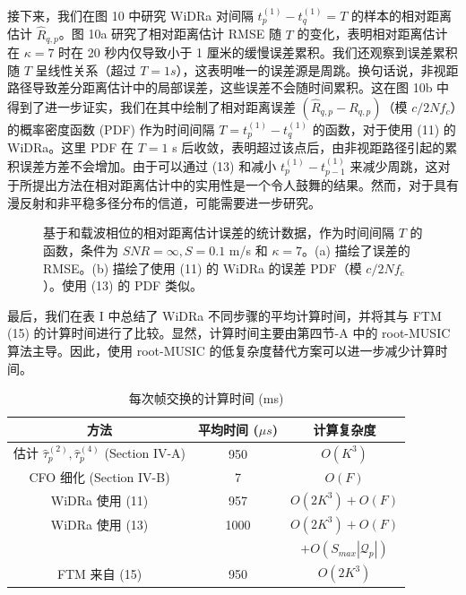 \documentclass[journal]{IEEEtran}
\begin{document}
接下来，我们在图 10 中研究 WiDRa 对间隔 $t_p^{(1)} - t_q^{(1)} = T$ 的样本的相对距离估计 $\hat{R}_{q,p}$。图 10a 研究了相对距离估计 RMSE 随 $T$ 的变化，表明相对距离估计在 $\kappa=7$ 时在 20 秒内仅导致小于 1 厘米的缓慢误差累积。我们还观察到误差累积随 $T$ 呈线性关系（超过 $T=1s$），这表明唯一的误差源是周跳。换句话说，非视距路径导致差分距离估计中的局部误差，这些误差不会随时间累积。这在图 10b 中得到了进一步证实，我们在其中绘制了相对距离误差 $(\hat{R}_{q,p} - R_{q,p})$（模 $c/2Nf_c$）的概率密度函数 (PDF) 作为时间间隔 $T = t_p^{(1)} - t_q^{(1)}$ 的函数，对于使用 (11) 的 WiDRa。这里 PDF 在 $T=1$ s 后收敛，表明超过该点后，由非视距路径引起的累积误差方差不会增加。由于可以通过 (13) 和减小 $t_p^{(1)} - t_{p-1}^{(1)}$ 来减少周跳，这对于所提出方法在相对距离估计中的实用性是一个令人鼓舞的结果。然而，对于具有漫反射和非平稳多径分布的信道，可能需要进一步研究。

\begin{figure}[htbp]
\centering
{}
\caption{基于和载波相位的相对距离估计误差的统计数据，作为时间间隔 $T$ 的函数，条件为 $SNR=\infty, S=0.1$ m/s 和 $\kappa=7$。(a) 描绘了误差的 RMSE。(b) 描绘了使用 (11) 的 WiDRa 的误差 PDF（模 $c/2Nf_c$）。使用 (13) 的 PDF 类似。}
\label{fig:fig10}
\end{figure}

最后，我们在表 I 中总结了 WiDRa 不同步骤的平均计算时间，并将其与 FTM (15) 的计算时间进行了比较。显然，计算时间主要由第四节-A 中的 root-MUSIC 算法主导。因此，使用 root-MUSIC 的低复杂度替代方案可以进一步减少计算时间。

\begin{table}[htbp]
\caption{每次帧交换的计算时间 (ms)}
\begin{center}
\begin{tabular}{|c|c|c|}
\hline
方法 & 平均时间 ($\mu s$) & 计算复杂度 \\
\hline
估计 $\hat{\tau}_p^{(2)}, \hat{\tau}_p^{(4)}$ (Section IV-A) & 950 & $O(K^3)$ \\
\hline
CFO 细化 (Section IV-B) & 7 & $O(F)$ \\
\hline
WiDRa 使用 (11) & 957 & $O(2K^3) + O(F)$ \\
\hline
WiDRa 使用 (13) & 1000 & $O(2K^3) + O(F)$ \\
 & & $+ O(S_{max}|\mathcal{Q}_p|)$ \\
\hline
FTM 来自 (15) & 950 & $O(2K^3)$ \\
\hline
\end{tabular}
\end{center}
\label{tab:table1}
\end{table}
\end{document}
